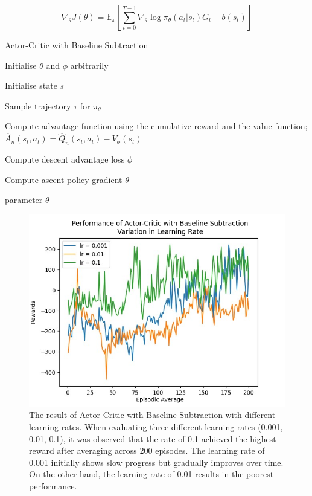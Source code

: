 \documentclass{article}
\begin{document}
\begin{equation*}
\nabla_\theta J(\theta) = \mathbb{E}_\pi[\sum _{t=0}^{T-1}  \nabla_\theta\log\pi_\theta (a_t|s_t)G_t - b(s_t)]
\end{equation*}
\begin{algorithm}[h!]
\caption{Actor-Critic with Baseline Subtraction}
\SetAlgoLined
\DontPrintSemicolon
\small %
Initialise $\theta$ and $\phi$ arbitrarily\;\\
{
    Initialise state $s$\;
     \item Sample trajectory $\tau$ for $\pi_\theta$
     \item
    {
     \item Compute advantage function using the cumulative reward and the value function;
     \(\hat{A}_n(s_t,a_t) = \hat{Q}_n(s_t,a_t) - V_\phi(s_t)\)
    }
    \item Compute descent advantage loss $\phi$
    \item Compute ascent policy gradient $\theta$
}
\State \Return parameter $\theta$
\end{algorithm}
\begin{figure}[h!]
\centering
\includegraphics[width=0.85\linewidth]{Report/images/09.Performance_of_Actor_Critc_BSub_LR.png}
\caption{\label{fig:ActorCritic with Baseline Subtraction - Variation in Learning Rate}The result of Actor Critic with Baseline Subtraction with different learning rates. 
When evaluating three different learning rates (0.001, 0.01, 0.1), it was observed that the rate of 0.1 achieved the highest reward after averaging across 200 episodes. The learning rate of 0.001 initially shows slow progress but gradually improves over time. On the other hand, the learning rate of 0.01 results in the poorest performance.}
\end{figure}
\end{document}
